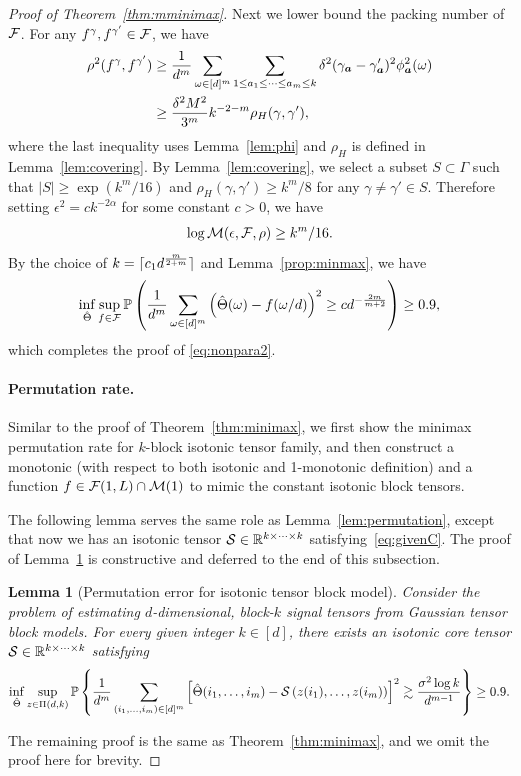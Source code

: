 \documentclass[12pt]{article}
\newtheorem{lem}{Lemma}
\theoremstyle{definition}
\begin{document}
{\begin{proof}[Proof of Theorem~\ref{thm:mminimax}]
Next we lower bound the packing number of $\mathcal{F}$. For any $f^\gamma,f^{\gamma'}\in\mathcal{F}$, we have
\begin{align}
    \rho^2(f^{\gamma},f^{\gamma'})&\geq \frac{1}{d^m}\sum_{\omega\in[d]^m}\sum_{1\leq a_1\leq\cdots\leq a_m\leq k}\delta^2(\gamma_{\bm{a}}-\gamma'_{\bm{a}})^2\phi_{\bm{a}}^2(\omega)\\&\geq {\delta^2 M^2\over  3^m}k^{-2-m}\rho_H(\gamma,\gamma'),
\end{align}
where the last inequality uses Lemma~\ref{lem:phi} and $\rho_H$ is defined in Lemma~\ref{lem:covering}. By Lemma~\ref{lem:covering}, we select a subset $S\subset \Gamma$ such that $|S|\geq \exp(k^m/16)$ and $\rho_H(\gamma,\gamma')\geq k^m/8$ for any $\gamma\neq \gamma'\in S$. Therefore setting $\epsilon^2 = c k^{-2\alpha}$ for some constant $c>0$, we have
\begin{align}
    \log \mathcal{M}(\epsilon,\mathcal{F},\rho)\geq k^m/16.
\end{align}
 By the choice of $k = \lceil c_1 d^{m\over 2+m}\rceil$ and Lemma~\ref{prop:minmax}, we have
\begin{align}
    \inf_{\hat\Theta}\sup_{f\in\mathcal{F}}\mathbb{P}\left(\frac{1}{d^m}\sum_{\omega\in[d]^m}\left(\hat\Theta(\omega)-f(\omega/d)\right)^2 \geq c d^{-{2m\over m+2}} \right) \geq 0.9,
\end{align}
which completes the proof of \eqref{eq:nonpara2}.

\paragraph{Permutation rate.}
Similar to the proof of Theorem~\ref{thm:minimax}, we first show the minimax permutation rate for $k$-block isotonic tensor family, and then construct a monotonic (with respect to both isotonic and 1-monotonic definition) and a function $f\in\mathcal{F}(1,L)\cap\mathcal{M}(1)$ to mimic the constant isotonic block tensors.

The following lemma serves the same role as Lemma~\ref{lem:permutation}, except that now we has an isotonic tensor $\mathcal{S}\in\mathbb{R}^{k\times \cdots \times k}$ satisfying~\eqref{eq:givenC}. The proof of Lemma~\ref{lem:permutation2} is constructive and deferred to the end of this subsection. 
\begin{lem}[Permutation error for isotonic tensor block model]\label{lem:permutation2}
Consider the problem of estimating $d$-dimensional, block-$k$ signal tensors from Gaussian tensor block models.
For every given integer $k\in[d]$, there exists an isotonic core tensor $\mathcal{S}\in\mathbb{R}^{k\times \cdots \times k}$ satisfying
\begin{equation}\label{eq:givenC2}
\inf_{\hat \Theta}\sup_{z \in \Pi(d,k)}\mathbb{P}\left\{{1\over d^m}\sum_{(i_1,\ldots,i_m)\in[d]^m}\left[\hat \Theta(i_1,\ldots,i_m)-\mathcal{S}\left(z(i_1),\ldots,z(i_m)\right)\right]^2\gtrsim \frac{\sigma^2\log k} {d^{m-1}}\right\}\geq 0.9.
\end{equation}
\end{lem}
The remaining proof is the same as Theorem~\ref{thm:minimax}, and we omit the proof here for brevity. 
 \end{proof}
 }
 
\end{document}
